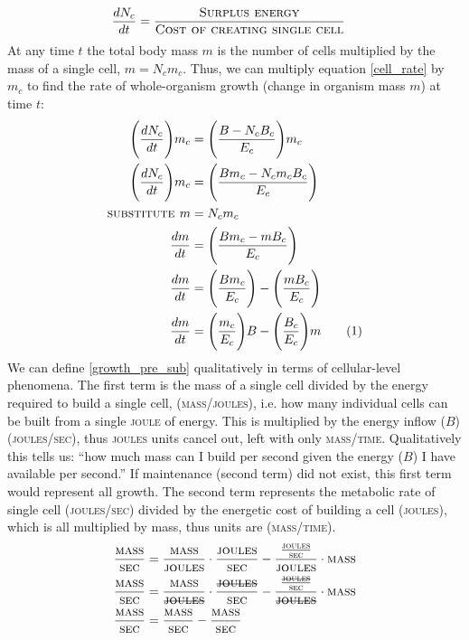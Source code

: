 \documentclass[a4paper]{article} %
\newcommand\numberthis{\addtocounter{equation}{1}\tag{\theequation}}
\begin{document}
\begin{align*}    
    \frac{dN_{c}}{dt} &= \frac{\textsc{Surplus energy}}{\textsc{Cost of creating single cell}}
\end{align*}
At any time $t$ the total body mass $m$ is the number of cells multiplied by the mass of a single cell, $m = N_{c}m_{c}$. Thus, we can multiply equation \cref{cell_rate} by $m_{c}$ to find the rate of whole-organism growth (change in organism mass $m$) at time $t$:
\begin{align*}
    \Bigg(\frac{dN_{c}}{dt}\Bigg)m_c &= \Bigg(\frac{B - N_{c}B_{c}}{E_{c}}\Bigg)m_c \\
    \Bigg(\frac{dN_{c}}{dt}\Bigg)m_c &= \Bigg(\frac{Bm_c - N_{c}m_{c}B_{c}}{E_c}\Bigg) \\
    \textsc{substitute } m &= N_{c}m_{c} \\
    \frac{dm}{dt} &= \Bigg(\frac{Bm_c - mB_{c}}{E_c}\Bigg) \\
    \frac{dm}{dt} &= \Bigg(\frac{Bm_c}{E_c}\Bigg) - \Bigg(\frac{mB_{c}}{E_c}\Bigg) \\
    \frac{dm}{dt} &= \Bigg(\frac{m_c}{E_c}\Bigg)B - \Bigg(\frac{B_{c}}{E_c}\Bigg)m \numberthis \label{growth_pre_sub}
\end{align*}
We can define \cref{growth_pre_sub} qualitatively in terms of cellular-level phenomena. The first term is the mass of a single cell divided by the energy required to build a single cell, (\textsc{mass/joules}), i.e. how many individual cells can be built from a single \textsc{joule} of energy. This is multiplied by the energy inflow ($B$) (\textsc{joules/sec}), thus \textsc{joules} units cancel out, left with only \textsc{mass/time}. Qualitatively this tells us: ``how much mass can I build per second given the energy ($B$) I have available per second.'' If maintenance (second term) did not exist, this first term would represent all growth. The second term represents the metabolic rate of single cell (\textsc{joules/sec}) divided by the energetic cost of building a cell (\textsc{joules}), which is all multiplied by mass, thus units are (\textsc{mass/time}).
\begin{align*}
    \frac{\textsc{mass}}{\textsc{sec}} &= \frac{\textsc{mass}}{\textsc{joules}}\cdot\frac{\textsc{joules}}{\textsc{sec}} - \frac{\frac{\textsc{joules}}{\textsc{sec}}}{\textsc{joules}}\cdot\textsc{mass} \\
    \frac{\textsc{mass}}{\textsc{sec}} &= \frac{\textsc{mass}}{\textsc{\st{joules}}}\cdot\frac{\textsc{\st{joules}}}{\textsc{sec}} - \frac{\frac{\textsc{\st{joules}}}{\textsc{sec}}}{\textsc{\st{joules}}}\cdot\textsc{mass} \\
    \frac{\textsc{mass}}{\textsc{sec}} &= \frac{\textsc{mass}}{\textsc{sec}} - \frac{\textsc{mass}}{\textsc{sec}} \\
\end{align*}
\end{document}
